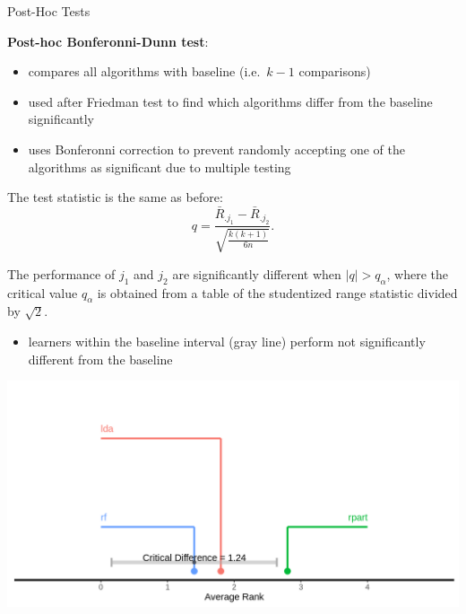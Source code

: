 \begin{frame}[c,allowframebreaks]{Post-Hoc Tests}
    \framebreak

    \textbf{Post-hoc Bonferonni-Dunn test}:

    \begin{itemize}
    \item compares all algorithms with baseline (i.e.\ $k-1$ comparisons)
    \item used after Friedman test to find which algorithms differ from the baseline significantly
    \item uses Bonferonni correction to prevent randomly accepting one of the algorithms as significant due to multiple testing
    \end{itemize}
    The test statistic is the same as before:
    $$q = \frac{\bar{R}_{.j_1} - \bar{R}_{.j_2}}{\sqrt{\frac{k(k+1)}{6n}}}.$$

    The performance of $j_1$ and $j_2$ are significantly different when $|q| >
    q_{\alpha}$, where the critical value $q_{\alpha}$ is obtained from a table
    of the studentized range statistic divided by $\sqrt{2}$.

    \framebreak

    \begin{itemize}
        \item learners within the baseline interval (gray line) perform not
            significantly different from the baseline
    \end{itemize}
    \begin{center}
        \includegraphics[height=.6\textheight]{crit-diff-bd}
    \end{center}

    \end{frame}

